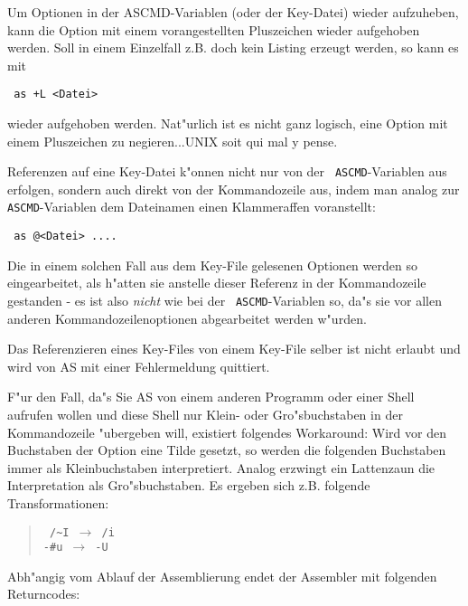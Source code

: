 \documentclass[12pt,a4paper,twoside]{report}
\begin{document}
Um Optionen in der ASCMD-Variablen (oder der Key-Datei) wieder aufzuheben,
kann die Option mit einem vorangestellten Pluszeichen wieder aufgehoben
werden.  Soll in einem Einzelfall z.B. doch kein Listing erzeugt werden,
so kann es mit
\begin{verbatim}
 as +L <Datei>
\end{verbatim}
wieder aufgehoben werden.  Nat"urlich ist es nicht ganz logisch, eine
Option mit einem Pluszeichen zu negieren...UNIX soit qui mal y pense.
\par
Referenzen auf eine Key-Datei k"onnen nicht nur von der {\tt
ASCMD}-Variablen aus erfolgen, sondern auch direkt von der Kommandozeile
aus, indem man analog zur {\tt ASCMD}-Variablen dem Dateinamen einen
Klammeraffen voranstellt:
\begin{verbatim}
 as @<Datei> ....
\end{verbatim}
Die in einem solchen Fall aus dem Key-File gelesenen Optionen werden so
eingearbeitet, als h"atten sie anstelle dieser Referenz in der
Kommandozeile gestanden - es ist also {\em nicht} wie bei der {\tt
ASCMD}-Variablen so, da"s sie vor allen anderen Kommandozeilenoptionen
abgearbeitet werden w"urden.
\par
Das Referenzieren eines Key-Files von einem Key-File selber ist nicht
erlaubt und wird von AS mit einer Fehlermeldung quittiert.
\par
F"ur den Fall, da"s Sie AS von einem anderen Programm oder einer Shell
aufrufen wollen und diese Shell nur Klein- oder Gro"sbuchstaben in der
Kommandozeile "ubergeben will, existiert folgendes Workaround: Wird vor
den Buchstaben der Option eine Tilde gesetzt, so werden die folgenden
Buchstaben immer als Kleinbuchstaben interpretiert.  Analog erzwingt
ein Lattenzaun die Interpretation als Gro"sbuchstaben.  Es ergeben
sich z.B. folgende Transformationen:
\begin{quote}{\tt
 /\verb!~!I $\longrightarrow$ /i \\
 -\verb!#!u $\longrightarrow$ -U}
\end{quote}
\par
Abh"angig vom Ablauf der Assemblierung endet der Assembler mit
folgenden Returncodes:
\end{document}
